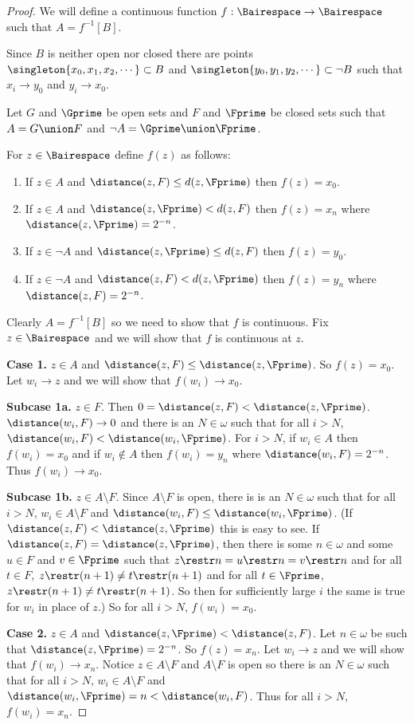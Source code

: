 \documentclass[oneside,12pt]{amsart}
\begin{document}
\begin{proof}
We will define a continuous function $f:\Bairespace\to\Bairespace$ such that $A=f^{-1}[B]$.

Since $B$ is neither open nor closed there are points $\singleton{x_0,x_1,x_2,\cdots} \subset B$ and
$\singleton{y_0,y_1,y_2,\cdots}\subset \neg B$ such that $x_i \to y_0$ and $y_i \to x_0$.

Let $G$ and $\Gprime$ be open sets and $F$ and $\Fprime$ be closed sets such that
$A=G\union F$ and $\neg A = \Gprime \union \Fprime$.

For $z\in\Bairespace$ define $f(z)$ as follows:
\begin{enumerate}
\item If $z\in A$ and $\distance(z,F) \leq d(z, \Fprime)$ then $f(z) = x_0$.
\item If $z\in A$ and $\distance(z,\Fprime) < d(z, F)$ then $f(z) = x_n$ where $\distance(z,\Fprime) = 2^{-n}$.
\item If $z\in \neg A$ and $\distance(z,\Fprime) \leq d(z, F)$ then $f(z) = y_0$.
\item If $z\in \neg A$ and $\distance(z,F) < d(z, \Fprime)$ then $f(z) = y_n$ where $\distance(z,F) = 2^{-n}$.
\end{enumerate}

Clearly $A=f^{-1}[B]$ so we need to show that $f$ is continuous. Fix $z\in\Bairespace$ and we will show that $f$ is continuous
at $z$.

\textbf{Case 1.} $z\in A$ and $\distance(z,F) \leq \distance(z, \Fprime)$. So $f(z) = x_0$.
Let $w_i \to z$ and we will show that $f(w_i) \to x_0$.

\textbf{Subcase 1a.} $z\in F$. Then $0 = \distance(z,F) < \distance(z, \Fprime)$.
$\distance(w_i, F) \to 0$ and there is an $N\in\omega$ such that for all $i>N$, $\distance(w_i, F) < \distance(w_i, \Fprime)$.
For $i>N$, if $w_i\in A$ then $f(w_i) = x_0$ and if $w_i\not\in A$
then $f(w_i) = y_n$ where $\distance(w_i, F) = 2^{-n}$. Thus $f(w_i) \to x_0$.

\textbf{Subcase 1b.} $z\in A\setminus F$. Since $A\setminus F$ is open, there is is an $N\in\omega$ such that for all $i>N$, $w_i\in A\setminus F$
and $\distance(w_i, F) \leq \distance(w_i, \Fprime)$. (If $\distance(z,F) < \distance(z,\Fprime)$ this is easy to see. If
$\distance(z,F) = \distance(z,\Fprime)$, then there is some $n\in\omega$ and some $u\in F$ and $v\in\Fprime$ such that $z\restr n = u \restr n = v\restr n$
and for all $t\in F$, $z\restr(n+1)\not=t\restr(n+1)$ and for all $t\in\Fprime$, $z\restr(n+1)\not=t\restr(n+1)$. So then for sufficiently large $i$
the same is true for $w_i$ in place of $z$.) So for all $i>N$, $f(w_i) = x_0$.

\textbf{Case 2.} $z\in A$ and $\distance(z,\Fprime) < \distance(z, F)$. Let $n\in\omega$ be such that $\distance(z,\Fprime) = 2^{-n}$.
So $f(z) = x_n$.
Let $w_i \to z$ and we will show that $f(w_i) \to x_n$. Notice $z\in A\setminus F$ and $A\setminus F$ is open so there is an $N\in\omega$
such that for all $i>N$, $w_i \in A\setminus F$ and $\distance(w_i, \Fprime) = n < \distance(w_i, F)$. Thus for all $i>N$,
$f(w_i) = x_n$.

\end{proof}
\end{document}
